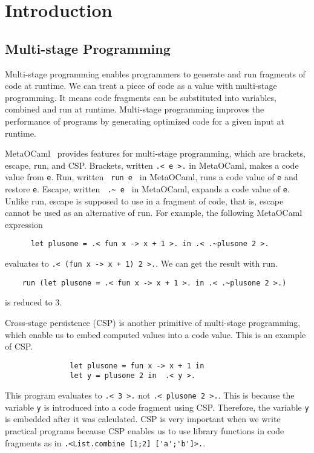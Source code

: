 
\section{Introduction}

\subsection{Multi-stage Programming}


Multi-stage programming enables programmers to generate and run fragments of code at runtime.
We can treat a piece of code as a value with multi-stage programming.
It means code fragments can be substituted into variables, combined and run at runtime.
Multi-stage programming improves the performance of programs by generating optimized code for a given input at runtime. \cite{taha2007gentle}

MetaOCaml~\cite{calcagno2003implementing}\cite{oleg2014} provides features for multi-stage programming, which are brackets, escape, run, and CSP.
Brackets, written \verb|.< e >.| in MetaOCaml, makes a code value from \verb|e|.
Run, written \verb| run e | in MetaOCaml, runs a code value of \verb|e| and restore \verb|e|.
Escape, written \verb| .~ e | in MetaOCaml, expands a code value of \verb|e|.
Unlike run, escape is supposed to use in a fragment of code, that is, escape cannot be used as an alternative of run.
For example, the following MetaOCaml expression

\begin{verbatim}
      let plusone = .< fun x -> x + 1 >. in .< .~plusone 2 >.
\end{verbatim}
evaluates to \verb|.< (fun x -> x + 1) 2 >.|. We can get the result with run.
\begin{verbatim}
    run (let plusone = .< fun x -> x + 1 >. in .< .~plusone 2 >.)
\end{verbatim}
is reduced to 3.


Cross-stage persistence (CSP) is another primitive of multi-stage programming, which enable us to embed computed values into a code value.
This is an example of CSP.
\begin{verbatim}
               let plusone = fun x -> x + 1 in
               let y = plusone 2 in  .< y >.
\end{verbatim}
This program evaluates to \verb|.< 3 >.| not  \verb|.< plusone 2 >.|.
This is because the variable \verb|y| is introduced into a code fragment using CSP.
Therefore, the variable \verb|y| is embedded after it was calculated.
CSP is very important when we write practical programs 
because CSP enables us to use library functions in code fragments as in \verb|.<List.combine [1;2] ['a';'b']>.|.

